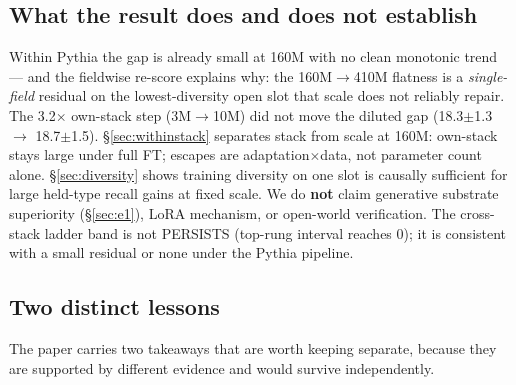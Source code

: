 \documentclass[11pt]{article}
\begin{document}
\subsection{What the result does and does not establish}\label{sec:establish}

Within Pythia the gap is already small at 160M with no clean monotonic trend --- and the fieldwise re-score explains why: the 160M$\rightarrow$410M flatness is a \emph{single-field} residual on the lowest-diversity open slot that scale does not reliably repair. The 3.2$\times$ own-stack step (3M$\rightarrow$10M) did not move the diluted gap (18.3$\pm$1.3 $\rightarrow$ 18.7$\pm$1.5). \S\ref{sec:withinstack} separates stack from scale at 160M: own-stack stays large under full FT; escapes are adaptation$\times$data, not parameter count alone. \S\ref{sec:diversity} shows training diversity on one slot is causally sufficient for large held-type recall gains at fixed scale. We do \textbf{not} claim generative substrate superiority (\S\ref{sec:e1}), LoRA mechanism, or open-world verification. The cross-stack ladder band is not PERSISTS (top-rung interval reaches 0); it is consistent with a small residual or none under the Pythia pipeline.

\subsection{Two distinct lessons}\label{sec:lessons}

The paper carries two takeaways that are worth keeping separate, because they are supported by different evidence and would survive independently.
\end{document}
